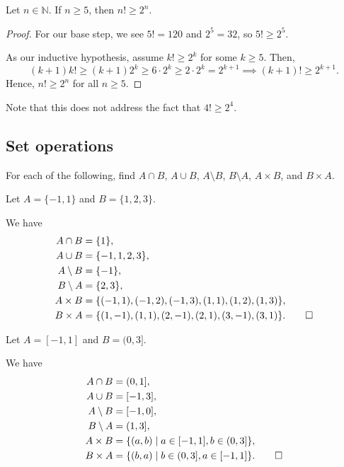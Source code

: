 \begin{claim}
Let $ n\in\mathbb{N} $. If $ n\geq 5 $, then $ n!\geq 2^n $.
\end{claim}
\begin{proof}
For our base step, we see $ 5!=120 $ and $ 2^5=32 $, so $ 5!\geq 2^5 $.

As our inductive hypothesis, assume $ k!\geq 2^k $ for some $ k\geq 5 $. Then,
\begin{equation*}
    (k+1)k!\geq (k+1)2^k \geq 6\cdot 2^k \geq 2\cdot 2^k=2^{k+1} \implies (k+1)!\geq 2^{k+1}.
\end{equation*}
Hence, $ n!\geq 2^n $ for all $ n\geq 5 $.
\end{proof}

Note that this does not address the fact that $ 4!\geq 2^4$.


\subsection*{Set operations}

For each of the following, find $ A\cap B $, $ A\cup B $, $ A\setminus B $, $ B\setminus A $, $ A\times B $, and $ B\times A $.

\begin{exer}
Let $ A=\{-1,1\} $ and $ B=\{1,2,3\} $.
\end{exer}
\begin{sltn}
We have
\begin{align*}
    A\cap B &= \{1\}, \\
    A\cup B &= \{-1,1,2,3\}, \\
    A\setminus B &= \{-1\}, \\
    B\setminus A &= \{2,3\}, \\
    A\times B &= \{(-1,1),(-1,2),(-1,3),(1,1),(1,2),(1,3)\}, \\
    B\times A &= \{(1,-1),(1,1),(2,-1),(2,1),(3,-1),(3,1)\}.\qedhere
\end{align*}
\end{sltn}

\begin{exer}
Let $ A=[-1,1] $ and $ B=(0,3] $.
\end{exer}
\begin{sltn}
We have
\begin{align*}
    A\cap B &= (0,1], \\
    A\cup B &= [-1,3], \\
    A\setminus B &= [-1,0], \\
    B\setminus A &= (1,3], \\
    A\times B &= \{(a,b)\mid a\in[-1,1],b\in (0,3]\}, \\
    B\times A &= \{(b,a)\mid b\in (0,3],a\in [-1,1]\}.\qedhere
\end{align*}
\end{sltn}


